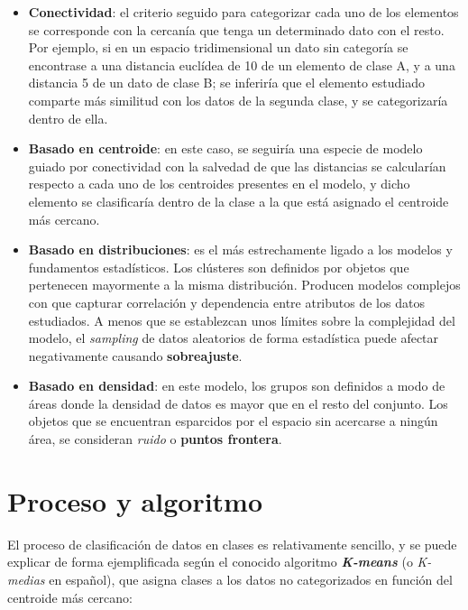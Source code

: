 \documentclass[]{report}
\begin{document}
			\begin{itemize}
				\item \textbf{Conectividad}: el criterio seguido para categorizar cada uno de los elementos se corresponde con la cercanía que tenga un determinado dato con el resto. Por ejemplo, si en un espacio tridimensional un dato sin categoría se encontrase a una distancia euclídea de 10 de un elemento de clase A, y a una distancia 5 de un dato de clase B; se inferiría que el elemento estudiado comparte más similitud con los datos de la segunda clase, y se categorizaría dentro de ella.
				\item \textbf{Basado en centroide}: en este caso, se seguiría una especie de modelo guiado por conectividad con la salvedad de que las distancias se calcularían respecto a cada uno de los centroides presentes en el modelo, y dicho elemento se clasificaría dentro de la clase a la que está asignado el centroide más cercano.
				\item \textbf{Basado en distribuciones}: es el más estrechamente ligado a los modelos y fundamentos estadísticos. Los clústeres son definidos por objetos que pertenecen mayormente a la misma distribución. Producen modelos complejos con que capturar correlación y dependencia entre atributos de los datos estudiados. A menos que se establezcan unos límites sobre la complejidad del modelo, el \textit{sampling} de datos aleatorios de forma estadística puede afectar negativamente causando \textbf{sobreajuste}.
				\item \textbf{Basado en densidad}: en este modelo, los grupos son definidos a modo de áreas donde la densidad de datos es mayor que en el resto del conjunto. Los objetos que se encuentran esparcidos por el espacio sin acercarse a ningún área, se consideran \textit{ruido} o \textbf{puntos frontera}.
			\end{itemize}
		
		\section{Proceso y algoritmo}
		
			El proceso de clasificación de datos en clases es relativamente sencillo, y se puede explicar de forma ejemplificada según el conocido algoritmo \textbf{\textit{K-means}} (o \textit{K-medias} en español), que asigna clases a los datos no categorizados en función del centroide más cercano:
		
\end{document}
